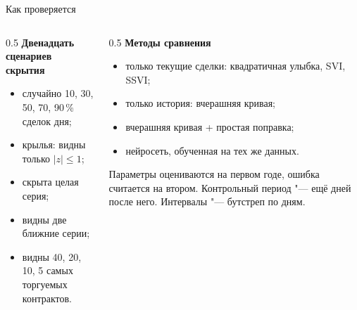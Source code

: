 \documentclass[aspectratio=169]{beamer}
\begin{document}
\begin{frame}{Как проверяется}
    \begin{columns}[T]
    \begin{column}{0.5\textwidth}
        \textbf{Двенадцать сценариев скрытия}
        \begin{itemize}
            \item случайно 10, 30, 50, 70, 90\,\% сделок дня;
            \item крылья: видны только $|z|\le 1$;
            \item скрыта целая серия;
            \item видны две ближние серии;
            \item видны 40, 20, 10, 5 самых торгуемых контрактов.
        \end{itemize}
    \end{column}
    \begin{column}{0.5\textwidth}
        \textbf{Методы сравнения}
        \begin{itemize}
            \item только текущие сделки: квадратичная улыбка, SVI, SSVI;
            \item только история: вчерашняя кривая;
            \item вчерашняя кривая + простая поправка;
            \item нейросеть, обученная на тех же данных.
        \end{itemize}
        \medskip
        Параметры оцениваются на первом годе, ошибка считается на втором. Контрольный период "--- ещё  дней после него. Интервалы "--- бутстреп по дням.
    \end{column}
    \end{columns}
\end{frame}
\end{document}
